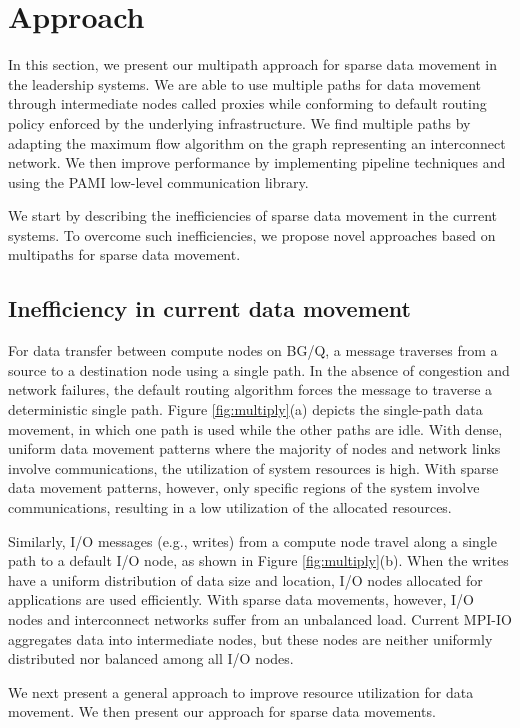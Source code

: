 \documentclass[final,5p,times]{elsarticle}
\begin{document}
\section{Approach}
\label{sec:approach}
In this section, we present our multipath approach for sparse data movement in the leadership systems. We are able to use multiple paths for data movement through intermediate nodes called proxies while conforming to default routing policy enforced by the underlying infrastructure. We find multiple paths by adapting the maximum flow algorithm on the graph representing an interconnect network. We then improve performance by implementing pipeline techniques and using the PAMI low-level communication library.

We start by describing the inefficiencies of sparse data movement in the current systems. To overcome such inefficiencies, we propose novel approaches based on multipaths for sparse data movement.

\subsection{Inefficiency in current data movement}
For data transfer between compute nodes on BG/Q, a message traverses from a source to a destination node using a single path. In the absence of congestion and network failures, the default routing algorithm forces the message to traverse a deterministic single path. Figure \ref{fig:multiply}(a) depicts the single-path data movement, in which one path is used while the other paths are idle. With dense, uniform data movement patterns where the majority of nodes and network links involve communications, the utilization of system resources is high. With sparse data movement patterns, however, only specific regions of the system involve communications, resulting in a low utilization of the allocated resources.

Similarly, I/O messages (e.g., writes) from a compute node travel along a single path to a default I/O node, as shown in Figure \ref{fig:multiply}(b). When the writes  have a uniform distribution of data size and location, I/O nodes allocated for applications are used efficiently. With sparse data movements, however, I/O nodes and interconnect networks suffer from an unbalanced load. Current MPI-IO aggregates data into intermediate nodes, but these nodes are neither uniformly distributed nor balanced among all I/O nodes.

We next present a general approach to improve resource utilization for data movement. We then present our approach for sparse data movements.
\end{document}
